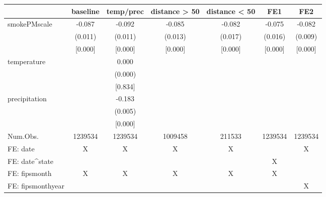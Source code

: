\begin{table}
\centering
\begin{tabular}[t]{lcccccc}
\toprule
  & baseline & temp/prec & distance > 50 & distance < 50 & FE1 & FE2\\
\midrule
smokePMscale & -0.087 & -0.092 & -0.085 & -0.082 & -0.075 & -0.082\\
 & (0.011) & (0.011) & (0.013) & (0.017) & (0.016) & (0.009)\\
 & {}[0.000] & {}[0.000] & {}[0.000] & {}[0.000] & {}[0.000] & {}[0.000]\\
temperature &  & 0.000 &  &  &  & \\
 &  & (0.000) &  &  &  & \\
 &  & {}[0.834] &  &  &  & \\
precipitation &  & -0.183 &  &  &  & \\
 &  & (0.005) &  &  &  & \\
 &  & {}[0.000] &  &  &  & \\
\midrule
Num.Obs. & 1239534 & 1239534 & 1009458 & 211533 & 1239534 & 1239534\\
FE: date & X & X & X & X &  & X\\
FE: date^state &  &  &  &  & X & \\
FE: fipsmonth & X & X & X & X & X & \\
FE: fipsmonthyear &  &  &  &  &  & X\\
\bottomrule
\end{tabular}
\end{table}

